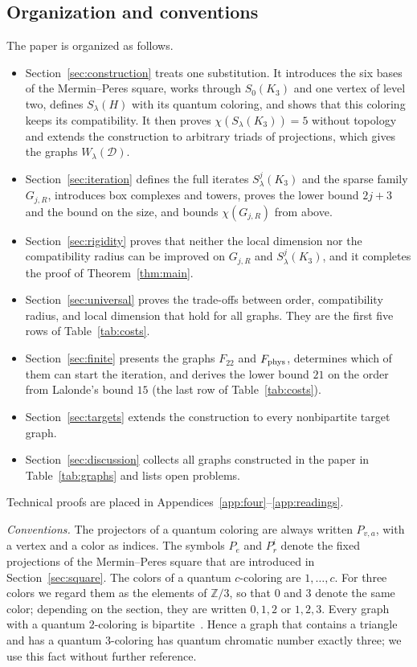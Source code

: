 \subsection{Organization and conventions}\label{sec:organization}

The paper is organized as follows.
\begin{itemize}
\item Section~\ref{sec:construction} treats one substitution. It introduces the six bases of the Mermin--Peres square, works through $S_0(K_3)$ and one vertex of level two, defines $S_\lambda(H)$ with its quantum coloring, and shows that this coloring keeps its compatibility. It then proves $\chi(S_\lambda(K_3))=5$ without topology and extends the construction to arbitrary triads of projections, which gives the graphs $W_\lambda(\mathcal D)$.
\item Section~\ref{sec:iteration} defines the full iterates $S^j_\lambda(K_3)$ and the sparse family $G_{j,R}$, introduces box complexes and towers, proves the lower bound $2j+3$ and the bound on the size, and bounds $\chi(G_{j,R})$ from above.
\item Section~\ref{sec:rigidity} proves that neither the local dimension nor the compatibility radius can be improved on $G_{j,R}$ and $S^j_\lambda(K_3)$, and it completes the proof of Theorem~\ref{thm:main}.
\item Section~\ref{sec:universal} proves the trade-offs between order, compatibility radius, and local dimension that hold for all graphs. They are the first five rows of Table~\ref{tab:costs}.
\item Section~\ref{sec:finite} presents the graphs $F_{22}$ and $F_{\rm phys}$, determines which of them can start the iteration, and derives the lower bound $21$ on the order from Lalonde's bound $15$ (the last row of Table~\ref{tab:costs}).
\item Section~\ref{sec:targets} extends the construction to every nonbipartite target graph.
\item Section~\ref{sec:discussion} collects all graphs constructed in the paper in Table~\ref{tab:graphs} and lists open problems.
\end{itemize}
Technical proofs are placed in Appendices~\ref{app:four}--\ref{app:readings}.

\emph{Conventions.} The projectors of a quantum coloring are always written $P_{v,a}$, with a vertex and a color as indices. The symbols $P_e$ and $P^i_r$ denote the fixed projections of the Mermin--Peres square that are introduced in Section~\ref{sec:square}. The colors of a quantum $c$-coloring are $1,\ldots,c$. For three colors we regard them as the elements of $\mathbb Z/3$, so that $0$ and $3$ denote the same color; depending on the section, they are written $0,1,2$ or $1,2,3$. Every graph with a quantum $2$-coloring is bipartite~\cite[Proposition~3]{CMNSW}. Hence a graph that contains a triangle and has a quantum $3$-coloring has quantum chromatic number exactly three; we use this fact without further reference.
